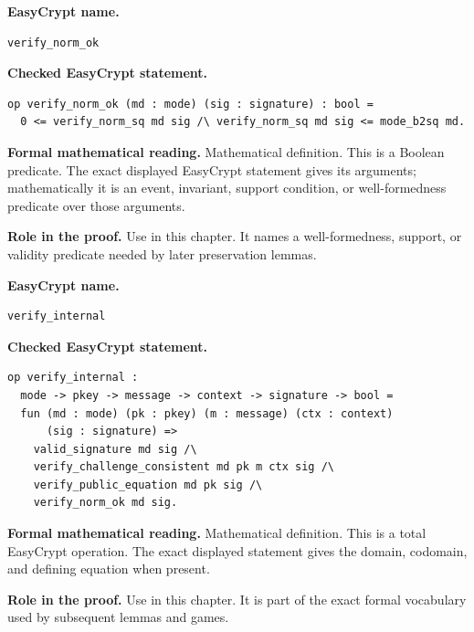 \begin{formaldefinition}
\noindent\textbf{EasyCrypt name.}
\begin{lstlisting}[language=EasyCrypt,basicstyle=\ttfamily\scriptsize]
verify_norm_ok
\end{lstlisting}
\noindent\textbf{Checked EasyCrypt statement.}
\begin{lstlisting}[language=EasyCrypt,basicstyle=\ttfamily\scriptsize]
op verify_norm_ok (md : mode) (sig : signature) : bool =
  0 <= verify_norm_sq md sig /\ verify_norm_sq md sig <= mode_b2sq md.
\end{lstlisting}
\noindent\textbf{Formal mathematical reading.}
Mathematical definition. This is a Boolean predicate.  The exact displayed EasyCrypt statement gives its arguments; mathematically it is an event, invariant, support condition, or well-formedness predicate over those arguments.

\noindent\textbf{Role in the proof.}
Use in this chapter. It names a well-formedness, support, or validity predicate needed by later preservation lemmas.

\end{formaldefinition}

\begin{formaldefinition}
\noindent\textbf{EasyCrypt name.}
\begin{lstlisting}[language=EasyCrypt,basicstyle=\ttfamily\scriptsize]
verify_internal
\end{lstlisting}
\noindent\textbf{Checked EasyCrypt statement.}
\begin{lstlisting}[language=EasyCrypt,basicstyle=\ttfamily\scriptsize]
op verify_internal :
  mode -> pkey -> message -> context -> signature -> bool =
  fun (md : mode) (pk : pkey) (m : message) (ctx : context)
      (sig : signature) =>
    valid_signature md sig /\
    verify_challenge_consistent md pk m ctx sig /\
    verify_public_equation md pk sig /\
    verify_norm_ok md sig.
\end{lstlisting}
\noindent\textbf{Formal mathematical reading.}
Mathematical definition. This is a total EasyCrypt operation.  The exact displayed statement gives the domain, codomain, and defining equation when present.

\noindent\textbf{Role in the proof.}
Use in this chapter. It is part of the exact formal vocabulary used by subsequent lemmas and games.

\end{formaldefinition}

